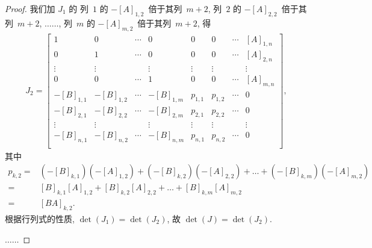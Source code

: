 \begin{proof}
    我们加 \(J_1\) 的%
    列~\(1\) 的 \(-[A]_{1,2}\)~倍于其列~\(m+2\),
    列~\(2\) 的 \(-[A]_{2,2}\)~倍于其列~\(m+2\),
    \(\dots \dots\),
    列~\(m\) 的 \(-[A]_{m,2}\)~倍于其列~\(m+2\),
    得
    \begin{align*}
        J_2 =
        \begin{bmatrix}
            1          & 0          & \cdots & 0          &
            0          & 0          & \cdots & [A]_{1,n}    \\
            0          & 1          & \cdots & 0          &
            0          & 0          & \cdots & [A]_{2,n}    \\
            \vdots     & \vdots     & {}     & \vdots     &
            \vdots     & \vdots     & {}     & \vdots       \\
            0          & 0          & \cdots & 1          &
            0          & 0          & \cdots & [A]_{m,n}    \\
            -[B]_{1,1} & -[B]_{1,2} & \cdots & -[B]_{1,m} &
            p_{1,1}    & p_{1,2}    & \cdots & 0            \\
            -[B]_{2,1} & -[B]_{2,2} & \cdots & -[B]_{2,m} &
            p_{2,1}    & p_{2,2}    & \cdots & 0            \\
            \vdots     & \vdots     & {}     & \vdots     &
            \vdots     & \vdots     & {}     & \vdots       \\
            -[B]_{n,1} & -[B]_{n,2} & \cdots & -[B]_{n,m} &
            p_{n,1}    & p_{n,2}    & \cdots & 0            \\
        \end{bmatrix},
    \end{align*}
    其中
    \begin{align*}
        p_{k,2}
        = {} &
        (-[B]_{k,1})(-[A]_{1,2})
        + (-[B]_{k,2})(-[A]_{2,2})
        + \dots
        + (-[B]_{k,m})(-[A]_{m,2})
        \\
        = {} &
        [B]_{k,1} [A]_{1,2}
        + [B]_{k,2} [A]_{2,2}
        + \dots
        + [B]_{k,m} [A]_{m,2}
        \\
        = {} &
        [BA]_{k,2}.
    \end{align*}
    根据行列式的性质,
    \(\det {(J_1)} = \det {(J_2)}\),
    故
    \(\det {(J)} = \det {(J_2)}\).

    \(\dots \dots\)


\end{proof}
